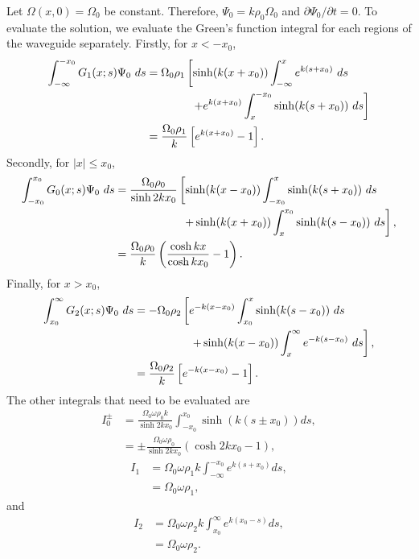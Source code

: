 Let $\Omega(x, 0) = \Omega_0$ be constant. Therefore, $\Psi_0 = k\rho_0\Omega_0$ and $\partial \Psi_0 / \partial t = 0$. To evaluate the solution, we evaluate the Green's function integral for each regions of the waveguide separately. Firstly, for $x < -x_0$, 
\begin{align}
\int_{-\infty}^{-x_0} G_1(x;s) \Psi_0 ~ds &= \Omega_0 \rho_1 \left[ \sinh(k(x+x_0)) \int_{-\infty}^{x} e^{k(s + x_0)} ~ds \right . \notag \\
&\qquad \qquad \left.+ e^{k(x+x_0)} \int_{x}^{-x_0} \sinh(k(s+x_0)) ~ds \right] \notag \\
&= \frac{\Omega_0 \rho_1}{k} \left[ e^{k(x+x_0)} - 1 \right].
\end{align}
Secondly, for $|x| \leq x_0$,
\begin{align}
\int_{-x_0}^{x_0} G_0(x;s) \Psi_0 ~ds &= \frac{\Omega_0 \rho_0}{\sinh{2kx_0}} \left[ \sinh(k(x-x_0)) \int_{-x_0}^{x} \sinh(k(s+x_0)) ~ds \right. \notag \\
&\qquad \qquad \qquad \left. + \sinh(k(x+x_0)) \int_{x}^{x_0} \sinh(k(s-x_0)) ~ds \right], \notag \\
&= \frac{\Omega_0 \rho_0}{k} \left( \frac{\cosh{kx}}{\cosh{kx_0}} - 1 \right).
\end{align}
Finally, for $x > x_0$,
\begin{align}
\int_{x_0}^{\infty} G_2(x;s) \Psi_0 ~ds &= - \Omega_0 \rho_2 \left[ e^{-k(x-x_0)} \int_{x_0}^{x} \sinh(k(s-x_0)) ~ds \right. \notag \\
&\qquad \qquad \quad \left. + \sinh(k(x-x_0)) \int_{x}^{\infty} e^{-k(s-x_0)} ~ds \right], \notag \\
&= \frac{\Omega_0 \rho_2}{k} \left[ e^{-k(x-x_0)} - 1 \right].
\end{align}
The other integrals that need to be evaluated are
\begin{align}
I_0^\pm &= \frac{\Omega_0\omega\rho_0k}{\sinh{2kx_0}} \int_{-x_0}^{x_0} \sinh(k(s \pm x_0)) ds, \\
&= \pm \frac{\Omega_0 \omega \rho_0}{\sinh{2kx_0}} (\cosh{2kx_0 - 1}),
\end{align}
\begin{align}
I_1 &= \Omega_0\omega\rho_1k \int_{-\infty}^{-x_0} e^{k(s + x_0)} ds, \\
&= \Omega_0 \omega \rho_1,
\end{align}
and
\begin{align}
I_2 &= \Omega_0\omega\rho_2k \int_{x_0}^{\infty} e^{k(x_0 - s)} ds, \\
&= \Omega_0 \omega \rho_2.
\end{align}
